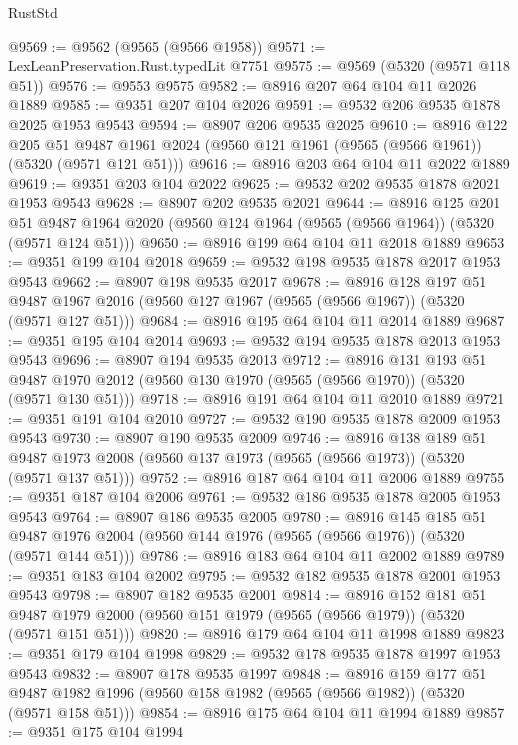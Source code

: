 \begin{lexlean}{RustStd}
\begin{coremodule}
@9569 := @9562 (@9565 (@9566 @1958))
@9571 := LexLeanPreservation.Rust.typedLit @7751
@9575 := @9569 (@5320 (@9571 @118 @51))
@9576 := @9553 @9575
@9582 := @8916 @207 @64 @104 @11 @2026 @1889
@9585 := @9351 @207 @104 @2026
@9591 := @9532 @206 @9535 @1878 @2025 @1953 @9543
@9594 := @8907 @206 @9535 @2025
@9610 := @8916
    @122
    @205
    @51
    @9487
    @1961
    @2024
    (@9560 @121 @1961 (@9565 (@9566 @1961)) (@5320 (@9571 @121 @51)))
@9616 := @8916 @203 @64 @104 @11 @2022 @1889
@9619 := @9351 @203 @104 @2022
@9625 := @9532 @202 @9535 @1878 @2021 @1953 @9543
@9628 := @8907 @202 @9535 @2021
@9644 := @8916
    @125
    @201
    @51
    @9487
    @1964
    @2020
    (@9560 @124 @1964 (@9565 (@9566 @1964)) (@5320 (@9571 @124 @51)))
@9650 := @8916 @199 @64 @104 @11 @2018 @1889
@9653 := @9351 @199 @104 @2018
@9659 := @9532 @198 @9535 @1878 @2017 @1953 @9543
@9662 := @8907 @198 @9535 @2017
@9678 := @8916
    @128
    @197
    @51
    @9487
    @1967
    @2016
    (@9560 @127 @1967 (@9565 (@9566 @1967)) (@5320 (@9571 @127 @51)))
@9684 := @8916 @195 @64 @104 @11 @2014 @1889
@9687 := @9351 @195 @104 @2014
@9693 := @9532 @194 @9535 @1878 @2013 @1953 @9543
@9696 := @8907 @194 @9535 @2013
@9712 := @8916
    @131
    @193
    @51
    @9487
    @1970
    @2012
    (@9560 @130 @1970 (@9565 (@9566 @1970)) (@5320 (@9571 @130 @51)))
@9718 := @8916 @191 @64 @104 @11 @2010 @1889
@9721 := @9351 @191 @104 @2010
@9727 := @9532 @190 @9535 @1878 @2009 @1953 @9543
@9730 := @8907 @190 @9535 @2009
@9746 := @8916
    @138
    @189
    @51
    @9487
    @1973
    @2008
    (@9560 @137 @1973 (@9565 (@9566 @1973)) (@5320 (@9571 @137 @51)))
@9752 := @8916 @187 @64 @104 @11 @2006 @1889
@9755 := @9351 @187 @104 @2006
@9761 := @9532 @186 @9535 @1878 @2005 @1953 @9543
@9764 := @8907 @186 @9535 @2005
@9780 := @8916
    @145
    @185
    @51
    @9487
    @1976
    @2004
    (@9560 @144 @1976 (@9565 (@9566 @1976)) (@5320 (@9571 @144 @51)))
@9786 := @8916 @183 @64 @104 @11 @2002 @1889
@9789 := @9351 @183 @104 @2002
@9795 := @9532 @182 @9535 @1878 @2001 @1953 @9543
@9798 := @8907 @182 @9535 @2001
@9814 := @8916
    @152
    @181
    @51
    @9487
    @1979
    @2000
    (@9560 @151 @1979 (@9565 (@9566 @1979)) (@5320 (@9571 @151 @51)))
@9820 := @8916 @179 @64 @104 @11 @1998 @1889
@9823 := @9351 @179 @104 @1998
@9829 := @9532 @178 @9535 @1878 @1997 @1953 @9543
@9832 := @8907 @178 @9535 @1997
@9848 := @8916
    @159
    @177
    @51
    @9487
    @1982
    @1996
    (@9560 @158 @1982 (@9565 (@9566 @1982)) (@5320 (@9571 @158 @51)))
@9854 := @8916 @175 @64 @104 @11 @1994 @1889
@9857 := @9351 @175 @104 @1994

\end{coremodule}
\end{lexlean}
